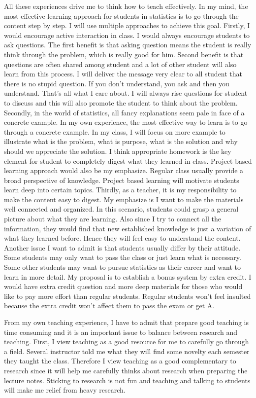 \documentclass[12pt]{amsart} \usepackage{amssymb}
\begin{document}
All these experiences drive me to think how to teach effectively.
In my mind, the most effective learning approach for students in statistics is to go through the content step by step.
I will use multiple approaches to achieve this goal.
Firstly, I would encourage active interaction in class.
I would always encourage students to ask questions.
The first benefit is that asking question means the student is really think through the problem, which is really good for him.
Second benefit is that questions are often shared among student and a lot of other student will also learn from this process.
I will deliver the message very clear to all student that there is no stupid question. 
If you don't understand, you ask and then you understand. That's all what I care about.
I will always rise questions for student to discuss and this will also promote the student to think about the problem.
Secondly, in the world of statistics, all fancy explanations seem pale in face of a concrete example.
In my own experience, the most effective way to learn is to go through a concrete example.
In my class, I will focus on more example to illustrate what is the problem, what is purpose, what is the solution and why should we appreciate the solution.
I think appropriate homework is the key element for student to completely digest what they learned in class.
Project based learning approach would also be my emphasize.
Regular class usually provide a broad perspective of knowledge.
Project based learning  will motivate students learn deep into certain topics.
Thirdly, as a teacher, it is my responsibility to make the content easy to digest.
My emphasize is I want to make the materials well connected and organized.
In this scenario, students could grasp a general picture about what they are learning.
Also since I try to connect all the information, they would find that new established knowledge is just a variation of what they learned before.
Hence they will feel easy to understand the content.
Another issue I want to admit is that students usually differ by their attitude.
Some students may only want to pass the class or just learn what is necessary.
Some other students may want to pursue statistics as their career and want to learn in more detail.
My proposal is to establish a bonus system by extra credit.
I would have extra credit question and more deep materials for those who would like to pay more effort than regular students.
Regular students won't feel insulted because the extra credit won't affect them to pass the exam or get A.

From my own teaching experience,
I have to admit that prepare good teaching is time consuming and it is an important issue to balance between research and teaching.
First, I view teaching as a good resource for me to carefully go through a field.
Several instructor told me what they will find some novelty each semester they taught the class.
Therefore I view teaching as a good complementary to research since it will help me carefully thinks about research when preparing the lecture notes.
Sticking to research is not fun and teaching and talking to students will make me relief from heavy research.
\end{document}
